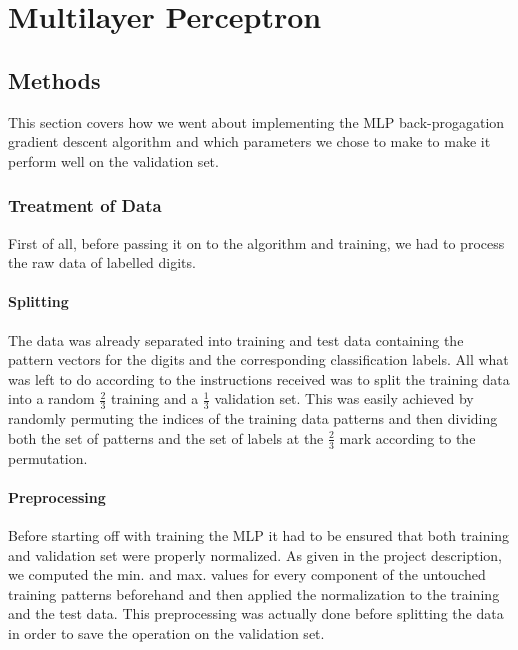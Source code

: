 \section{Multilayer Perceptron}

\subsection{Methods}
This section covers how we went about implementing the MLP back-progagation gradient descent algorithm and which parameters we chose to make to make it perform well on the validation set.

\subsubsection{Treatment of Data}
First of all, before passing it on to the algorithm and training, we had to process the raw data of labelled digits.
\paragraph{Splitting}
The data was already separated into training and test data containing the pattern vectors for the digits and the corresponding classification labels. All what was left to do according to the instructions received was to split the training data into a random $\frac{2}{3}$ training and a $\frac{1}{3}$ validation set. This was easily achieved by randomly permuting the indices of the training data patterns and then dividing both the set of patterns and the set of labels at the $\frac{2}{3}$ mark according to the permutation.
\paragraph{Preprocessing}
Before starting off with training the MLP it had to be ensured that both training and validation set were properly normalized. As given in the project description, we computed the min. and max. values for every component of the untouched training patterns beforehand and then applied the normalization to the training and the test data. This preprocessing was actually done before splitting the data in order to save the operation on the validation set.

